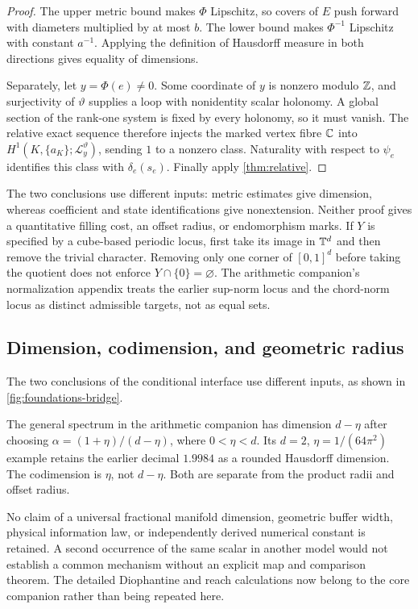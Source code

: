 \documentclass[11pt,a4paper]{article}
\begin{document}
\begin{proof}
The upper metric bound makes $\Phi$ Lipschitz, so covers of $E$ push
forward with diameters multiplied by at most $b$.  The lower bound makes
$\Phi^{-1}$ Lipschitz with constant $a^{-1}$.  Applying the definition
of Hausdorff measure in both directions gives equality of dimensions.

Separately, let $y=\Phi(e)\ne0$.  Some coordinate of $y$ is nonzero
modulo $\mathbb Z$, and surjectivity of $\vartheta$ supplies a loop with
nonidentity scalar holonomy.  A global section of the rank-one system
is fixed by every holonomy, so it must vanish.  The relative exact
sequence therefore injects the marked vertex fibre $\mathbb C$ into
$H^1(K,\{a_K\};\mathcal L_y^\vartheta)$, sending $1$ to a nonzero
class.  Naturality with respect to $\psi_e$ identifies this class with
$\delta_e(s_e)$.  Finally apply \cref{thm:relative}.
\end{proof}

The two conclusions use different inputs: metric estimates give dimension,
whereas coefficient and state identifications give nonextension.  Neither
proof gives a quantitative filling cost, an offset radius, or endomorphism
marks.  If $Y$ is specified by a cube-based periodic locus, first take its
image in $\mathbb T^d$ and then remove the trivial character.  Removing only one
corner of $[0,1]^d$ before taking the quotient does not enforce $Y\cap\{0\}
=\varnothing$.  The arithmetic companion's normalization appendix treats
the earlier sup-norm locus and the chord-norm locus as distinct admissible
targets, not as equal sets.

\subsection{Dimension, codimension, and geometric radius}

The two conclusions of the conditional interface use different inputs,
as shown in \cref{fig:foundations-bridge}.


The general spectrum in the arithmetic companion has dimension
$d-\eta$ after choosing $\alpha=(1+\eta)/(d-\eta)$, where
$0<\eta<d$.  Its $d=2$, $\eta=1/(64\pi^2)$ example retains the earlier
decimal $1.9984$ as a rounded Hausdorff dimension.  The codimension is
$\eta$, not $d-\eta$.  Both are separate from the product radii and
offset radius.

No claim of a universal fractional manifold dimension, geometric buffer
width, physical information law, or independently derived numerical
constant is retained.  A second occurrence of the same scalar in another
model would not establish a common mechanism without an explicit map and
comparison theorem.  The detailed Diophantine and reach calculations now
belong to the core companion rather than being repeated here.
\end{document}
